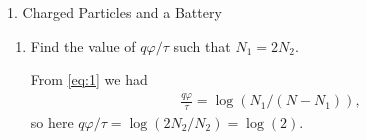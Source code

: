 \documentclass[11pt]{article}
\begin{document}
\begin{problem}{1. Charged Particles and a Battery}
\begin{enumerate}[label=(\alph*)]
\begin{answer}
\begin{equation}
\begin{aligned}
            \Rightarrow & N_1(1 + \exp( \frac{q\varphi}{\tau} )) = N\exp( \frac{q\varphi}{\tau} ) \\
            \Rightarrow & N_1 = \frac{N\exp(q\varphi/\tau)}{1 + \exp(q\varphi/\tau)} = \frac{N}{1 + \exp(-q\varphi/\tau)}.
          \end{aligned}
          \end{equation}
        \end{answer}
  \item Find the value of \(q\varphi/\tau\) such that \(N_1=2N_2\).
        \begin{answer}
          From \cref{eq:1} we had
          \begin{equation}
          \label{eq:3}
          \begin{aligned}
            \frac{q\varphi}{\tau} = \log(N_1/(N-N_1)),
          \end{aligned}
        \end{equation}
        so here \( q\varphi/\tau = \log(2N_2/N_2) = \log(2) \).
        \end{answer}
\end{enumerate}
\end{problem}
\end{document}
